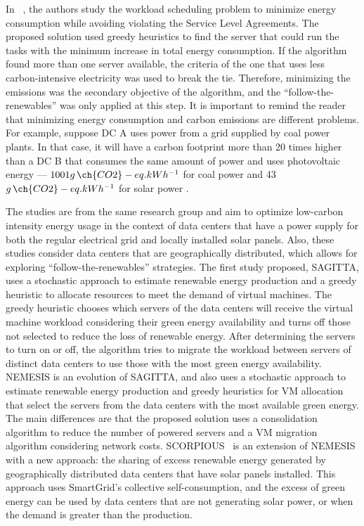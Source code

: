In ~\citet{KHODAYARSERESHT2023_energycarbonaware_vm}, the authors study the workload scheduling problem to minimize energy consumption while avoiding violating the Service Level Agreements. The proposed solution used greedy heuristics to find the server that could run the tasks with the minimum increase in total energy consumption. If the algorithm found more than one server available, the criteria of the one that uses less carbon-intensive electricity was used to break the tie. Therefore, minimizing the emissions was the secondary objective of the algorithm, and the ``follow-the-renewables'' was only applied at this step. It is important to remind the reader that minimizing energy consumption and carbon emissions are different problems. For example, suppose DC A uses power from a grid supplied by coal power plants. In that case, it will have a carbon footprint more than 20 times higher than a DC B that consumes the same amount of power and uses photovoltaic energy ---  $1001 g\,\ch{CO2}-eq.kWh^{-1}$ for coal power and 43  $g\,\ch{CO2}-eq.kWh^{-1}$ for solar power \cite{nrel_lifecycle_2021}. 


The studies \citet{SAGITTA,NEMESIS,SCORPIOUS} are from the same research group and aim to optimize low-carbon intensity energy usage in the context of data centers that have a power supply for both the regular electrical grid and locally installed solar panels. Also, these studies consider data centers that are geographically distributed, which allows for exploring ``follow-the-renewables'' strategies. The first study proposed, SAGITTA\citep{SAGITTA}, uses a stochastic approach to estimate renewable energy production and a greedy heuristic to allocate resources to meet the demand of virtual machines. The greedy heuristic chooses which servers of the data centers will receive the virtual machine workload considering their green energy availability and turns off those not selected to reduce the loss of renewable energy. After determining the servers to turn on or off, the algorithm tries to migrate the workload between servers of distinct data centers to use those with the most green energy availability. NEMESIS\citep{NEMESIS} is an evolution of SAGITTA, and also uses a stochastic approach to estimate renewable energy production and greedy heuristics for VM allocation that select the servers from the data centers with the most available green energy. The main differences are that the proposed solution uses a consolidation algorithm to reduce the number of powered servers and a VM migration algorithm considering network costs. SCORPIOUS~\citep{SCORPIOUS} is an extension of NEMESIS  with a new approach: the sharing of excess renewable energy generated by geographically distributed data centers that have solar panels installed. This approach uses SmartGrid's collective self-consumption, and the excess of green energy can be used by data centers that are not generating solar power, or when the demand is greater than the production.


